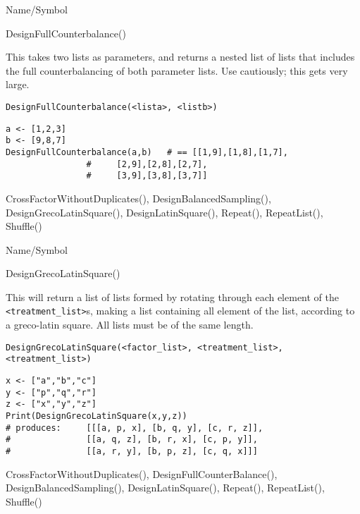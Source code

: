 \rl




\begin{desc}{Name/Symbol}

\item[Name/Symbol]	DesignFullCounterbalance()

\item[Description]	This takes two lists as parameters, and returns a nested list 
		of lists that includes the full counterbalancing of both 
		parameter lists.  Use cautiously; this gets very large.

\item[Usage]
\begin{verbatim}
DesignFullCounterbalance(<lista>, <listb>)
\end{verbatim}

\item[Example]
\begin{verbatim}
a <- [1,2,3]
b <- [9,8,7]
DesignFullCounterbalance(a,b)	# == [[1,9],[1,8],[1,7],
				#     [2,9],[2,8],[2,7],
				#     [3,9],[3,8],[3,7]]
\end{verbatim}

\item[See Also]	CrossFactorWithoutDuplicates(), DesignBalancedSampling(),
		DesignGrecoLatinSquare(), DesignLatinSquare(), Repeat(), 
		RepeatList(), Shuffle()
\end{desc}

\rl




\begin{desc}{Name/Symbol}
\item[Name/Symbol]	DesignGrecoLatinSquare()

\item[Description]	This will return a list of lists formed by rotating through 
		each element of the \verb+<treatment_list>+s, making a list
 		containing all element of the list, according to a greco-latin 
		square.  All lists must be of the same length.

\item[Usage]
\begin{verbatim}
DesignGrecoLatinSquare(<factor_list>, <treatment_list>, 
<treatment_list>)
\end{verbatim}

\item[Example]
\begin{verbatim}
x <- ["a","b","c"]
y <- ["p","q","r"]
z <- ["x","y","z"]
Print(DesignGrecoLatinSquare(x,y,z))
# produces:   	[[[a, p, x], [b, q, y], [c, r, z]], 
#               [[a, q, z], [b, r, x], [c, p, y]], 
#               [[a, r, y], [b, p, z], [c, q, x]]]
\end{verbatim}

\item[See Also]	CrossFactorWithoutDuplicates(), DesignFullCounterBalance(), 
		DesignBalancedSampling(), DesignLatinSquare(), Repeat(),		
		RepeatList(), Shuffle()
\end{desc}

